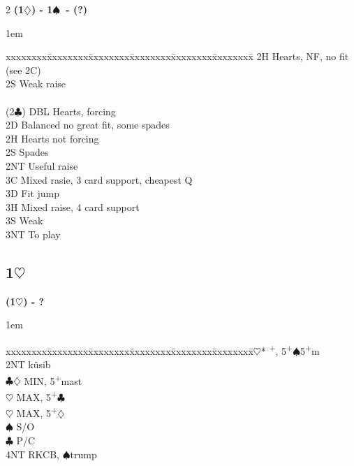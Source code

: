 \documentclass[10pt]{article}
\renewcommand{\c}{$\clubsuit$}
\renewcommand{\d}{$\diamondsuit$}
\newcommand{\h}{$\heartsuit$}
\newcommand{\s}{$\spadesuit$}
\newcommand{\p}{\textsuperscript{+}}
\newenvironment{bidtable}[1][]
{\textbf{#1}
  \begin{adjustwidth}{1em}{}
    \addvspace{2pt}
    \begin{tabbing}
      xxxxxxxx\=xxxxxxxx\=xxxxxxxx\=xxxxxxxx\=xxxxxxxx\=xxxxxxxx\=\kill}
{\end{tabbing}\end{adjustwidth}\bigskip}%
\newcommand{\pdfh}{\texorpdfstring{\h{}}{H}}
\begin{document}
\begin{multicols*}{2}
\begin{bidtable}[(1\d) - 1\s\ - (?)]
       \> 2H    \> Hearts, NF, no fit (see 2C)             \\
       \> 2S    \> Weak raise                              \\
                                                           \\
(2\c)  \> DBL   \> Hearts, forcing                         \\
       \> 2D    \> Balanced no great fit, some spades      \\
       \> 2H    \> Hearts not forcing                      \\
       \> 2S    \> Spades                                  \\
       \> 2NT   \> Useful raise                            \\
       \> 3C    \> Mixed rasie, 3 card support, cheapest Q \\
       \> 3D    \> Fit jump                                \\
       \> 3H    \> Mixed raise, 4 card support             \\
       \> 3S    \> Weak                                    \\
       \> 3NT   \> To play
\end{bidtable}


\subsection{1\pdfh}

\begin{bidtable}[(1\h) - ?]
2\h* {}\p, 5\p\s 5\p m             \\
     \> 2NT \> küsib                  \\
     \>     \c\d \> MIN, 5\p mast \\
     \>     \h   \> MAX, 5\p\c    \\
     \>     \h   \> MAX, 5\p\d    \\
     \s \> S/O                    \\
     \c \> P/C                    \\
     \> 4NT \> RKCB, \s trump
\end{bidtable}


\end{multicols*}
\end{document}
